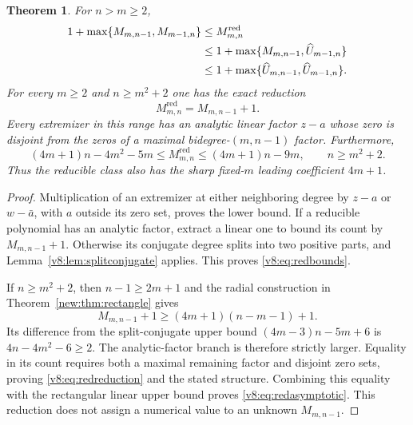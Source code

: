 \documentclass[UTF8,11pt]{ctexart}
\newtheorem{thm}{Theorem}[section]
\theoremstyle{definition}
\numberwithin{equation}{section}
\begin{document}
\begin{thm}\label{v8:thm:redlinear}
For $n>m\ge2$,
\begin{align}
 1+\max\{M_{m,n-1},M_{m-1,n}\}
 &\le M^{\mathrm{red}}_{m,n}\notag\\
 &\le1+\max\{M_{m,n-1},\widehat U_{m-1,n}\}\notag\\
 &\le1+\max\{\widehat U_{m,n-1},\widehat U_{m-1,n}\}.
 \label{v8:eq:redbounds}
\end{align}
For every $m\ge2$ and $n\ge m^2+2$ one has the exact reduction
\begin{equation}\label{v8:eq:redreduction}
 M^{\mathrm{red}}_{m,n}=M_{m,n-1}+1.
\end{equation}
Every extremizer in this range has an analytic linear factor
$z-a$ whose zero is disjoint from the zeros of a maximal
bidegree-$(m,n-1)$ factor. Furthermore,
\begin{equation}\label{v8:eq:redasymptotic}
 (4m+1)n-4m^2-5m
 \le M^{\mathrm{red}}_{m,n}
 \le(4m+1)n-9m,
 \qquad n\ge m^2+2.
\end{equation}
Thus the reducible class also has the sharp fixed-$m$ leading
coefficient $4m+1$.
\end{thm}
\begin{proof}
Multiplication of an extremizer at either neighboring degree by
$z-a$ or $w-\bar a$, with $a$ outside its zero set, proves the lower
bound. If a reducible polynomial has an analytic factor, extract
a linear one to bound its count by $M_{m,n-1}+1$. Otherwise its
conjugate degree splits into two positive parts, and
Lemma~\ref{v8:lem:splitconjugate} applies. This proves
\eqref{v8:eq:redbounds}.

If $n\ge m^2+2$, then $n-1\ge2m+1$ and the radial construction
in Theorem~\ref{new:thm:rectangle} gives
\[
 M_{m,n-1}+1\ge(4m+1)(n-m-1)+1.
\]
Its difference from the split-conjugate upper bound
$(4m-3)n-5m+6$ is $4n-4m^2-6\ge2$.
The analytic-factor branch is therefore strictly larger.
Equality in its count requires both a maximal remaining factor
and disjoint zero sets, proving \eqref{v8:eq:redreduction} and
the stated structure. Combining this equality with the rectangular
linear upper bound proves \eqref{v8:eq:redasymptotic}.
This reduction does not assign a numerical value to an unknown
$M_{m,n-1}$.
\end{proof}
\end{document}
